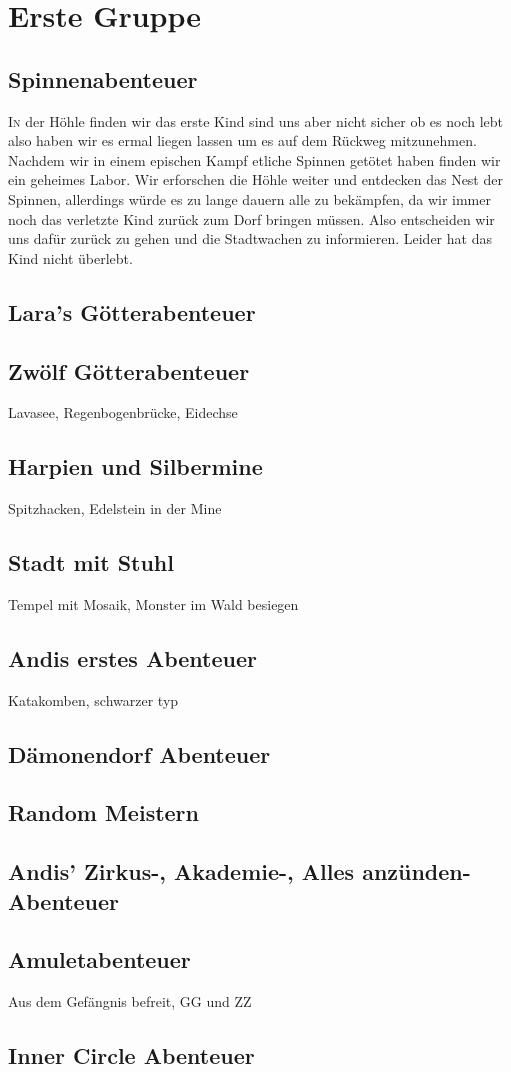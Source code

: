 \chapter{Erste Gruppe}
\section{Spinnenabenteuer}
\lettrine{I}{n} der H\"ohle finden wir das erste Kind sind uns aber nicht sicher ob es noch lebt also haben wir es ermal liegen lassen um es auf dem R\"uckweg mitzunehmen. Nachdem wir in einem epischen Kampf etliche Spinnen get\"otet haben finden wir ein geheimes Labor. Wir erforschen die H\"ohle weiter und entdecken das Nest der Spinnen, allerdings w\"urde es zu lange dauern alle zu bek\"ampfen, da wir immer noch das verletzte Kind zur\"uck zum Dorf bringen m\"ussen. Also entscheiden wir uns daf\"ur zur\"uck zu gehen und die Stadtwachen zu informieren. Leider hat das Kind nicht \"uberlebt.

\section{Lara's G\"otterabenteuer}
\section{Zw\"olf G\"otterabenteuer}
Lavasee, Regenbogenbr\"ucke, Eidechse
\section{Harpien und Silbermine}
Spitzhacken, Edelstein in der Mine
\section{Stadt mit Stuhl}
Tempel mit Mosaik, Monster im Wald besiegen
\section{Andis erstes Abenteuer}
Katakomben, schwarzer typ
\section{D\"amonendorf Abenteuer}
\section{Random Meistern}
\section{Andis' Zirkus-, Akademie-, Alles anz\"unden-Abenteuer}
\section{Amuletabenteuer}
Aus dem Gef\"angnis befreit, GG und ZZ
\section{Inner Circle Abenteuer}
